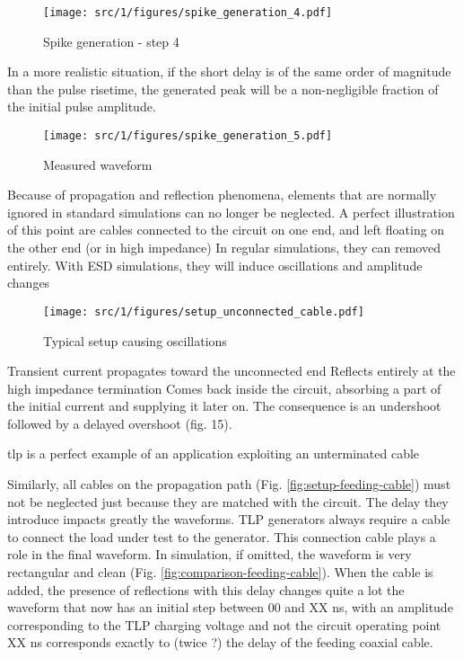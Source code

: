 \begin{figure}[!h]
  \centering
  \texttt{[image: src/1/figures/spike\_generation\_4.pdf]}
  \caption{Spike generation - step 4}
  \label{fig:spike-step-4}
\end{figure}

In a more realistic situation, if the short delay is of the same order of magnitude than the pulse risetime, the generated peak will be a non-negligible fraction of the initial pulse amplitude.

\begin{figure}[!h]
  \centering
  \texttt{[image: src/1/figures/spike\_generation\_5.pdf]}
  \caption{Measured waveform}
  \label{fig:spike-step-4}
\end{figure}

Because of propagation and reflection phenomena, elements that are normally ignored in standard simulations can no longer be neglected.
A perfect illustration of this point are cables connected to the circuit on one end, and left floating on the other end (or in high impedance)
In regular simulations, they can removed entirely.
With ESD simulations, they will induce oscillations and amplitude changes

\begin{figure}[!h]
  \centering
  \texttt{[image: src/1/figures/setup\_unconnected\_cable.pdf]}
  \caption{Typical setup causing oscillations}
  \label{fig:setup-unconnected-cable}
\end{figure}

Transient current propagates toward the unconnected end
Reflects entirely at the high impedance termination
Comes back inside the circuit, absorbing a part of the initial current and supplying it later on.
The consequence is an undershoot followed by a delayed overshoot (fig. 15).

\gls{tlp} is a perfect example of an application exploiting an unterminated cable

Similarly, all cables on the propagation path (Fig. \ref{fig:setup-feeding-cable}) must not be neglected just because they are matched with the circuit.
The delay they introduce impacts greatly the waveforms.
TLP generators always require a cable to connect the load under test to the generator.
This connection cable plays a role in the final waveform.
In simulation, if omitted, the waveform is very rectangular and clean (Fig. \ref{fig:comparison-feeding-cable}).
When the cable is added, the presence of reflections with this delay changes quite a lot the waveform that now has an initial step between 00 and XX ns, with an amplitude corresponding to the TLP charging voltage and not the circuit operating point
XX ns corresponds exactly to (twice ?) the delay of the feeding coaxial cable.

